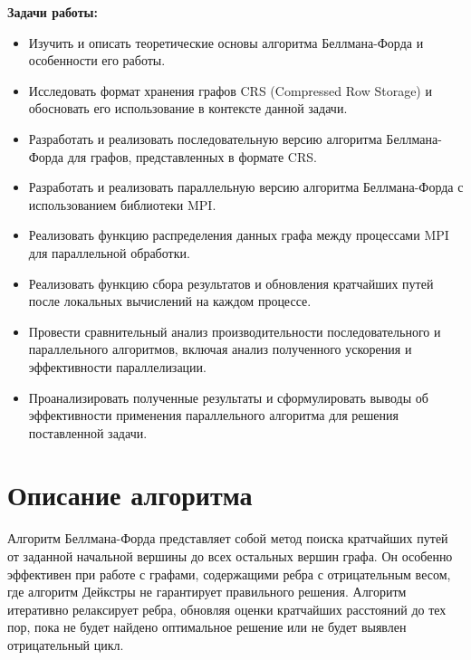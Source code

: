 \documentclass[a4paper, 14pt]{article}
\begin{document}
\textbf{Задачи работы:}
\vspace{-1em}
\begin{itemize}
    \setlength\itemsep{0.2cm}
    \item Изучить и описать теоретические основы алгоритма Беллмана-Форда и особенности его работы.
    \item Исследовать формат хранения графов CRS (Compressed Row Storage) и обосновать его использование в контексте данной задачи.
	\item Разработать и реализовать последовательную версию алгоритма Беллмана-Форда для графов, представленных в формате CRS.
    \item Разработать и реализовать параллельную версию алгоритма Беллмана-Форда с использованием библиотеки MPI.
    \item Реализовать функцию распределения данных графа между процессами MPI для параллельной обработки.
    \item Реализовать функцию сбора результатов и обновления кратчайших путей после локальных вычислений на каждом процессе.
    \item Провести сравнительный анализ производительности последовательного и параллельного алгоритмов, включая анализ полученного ускорения и эффективности параллелизации.
     \item Проанализировать полученные результаты и сформулировать выводы об эффективности применения параллельного алгоритма для решения поставленной задачи.
\end{itemize}

	\newpage
	\section*{\centering Описание алгоритма}

\indent Алгоритм Беллмана-Форда представляет собой метод поиска кратчайших путей от заданной начальной вершины до всех остальных вершин графа. Он особенно эффективен при работе с графами, содержащими ребра с отрицательным весом, где алгоритм Дейкстры не гарантирует правильного решения. Алгоритм итеративно релаксирует ребра, обновляя оценки кратчайших расстояний до тех пор, пока не будет найдено оптимальное решение или не будет выявлен отрицательный цикл.
\end{document}
